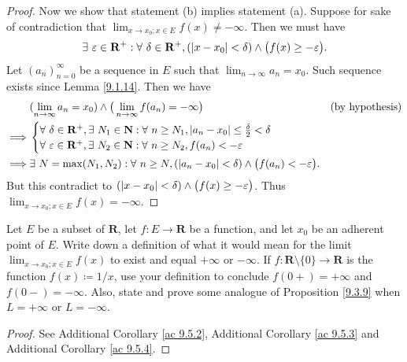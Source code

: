 \begin{proof}
    Now we show that statement (b) implies statement (a).
    Suppose for sake of contradiction that \(\lim_{x \to x_0 ; x \in E} f(x) \neq -\infty\).
    Then we must have
    \[
        \exists\ \varepsilon \in \mathbf{R}^+ : \forall\ \delta \in \mathbf{R}^+, (\abs*{x - x_0} < \delta) \land \big(f(x) \geq -\varepsilon\big).
    \]
    Let \((a_n)_{n = 0}^\infty\) be a sequence in \(E\) such that \(\lim_{n \to \infty} a_n = x_0\).
    Such sequence exists since Lemma \ref{9.1.14}.
    Then we have
    \begin{align*}
                 & (\lim_{n \to \infty} a_n = x_0) \land \big(\lim_{n \to \infty} f(a_n) = -\infty\big)                                & \text{(by hypothesis)} \\
        \implies & \begin{cases}
            \forall\ \delta \in \mathbf{R}^+, \exists\ N_1 \in \mathbf{N} : \forall\ n \geq N_1, \abs*{a_n - x_0} \leq \frac{\delta}{2} < \delta \\
            \forall\ \varepsilon \in \mathbf{R}^+, \exists\ N_2 \in \mathbf{N} : \forall\ n \geq N_2, f(a_n) < -\varepsilon
        \end{cases}                                                                                                                   \\
        \implies & \exists\ N = \max(N_1, N_2) : \forall\ n \geq N, (\abs*{a_n - x_0} < \delta) \land \big(f(a_n) < -\varepsilon\big).
    \end{align*}
    But this contradict to \((\abs*{x - x_0} < \delta) \land \big(f(x) \geq -\varepsilon\big)\).
    Thus \(\lim_{x \to x_0 ; x \in E} f(x) = -\infty\).
\end{proof}

\exercisesection

\begin{exercise}\label{ex 9.5.1}
    Let \(E\) be a subset of \(\mathbf{R}\), let \(f : E \to \mathbf{R}\) be a function, and let \(x_0\) be an adherent point of \(E\).
    Write down a definition of what it would mean for the limit \(\lim_{x \to x_0 ; x \in E} f(x)\) to exist and equal \(+\infty\) or \(-\infty\).
    If \(f : \mathbf{R} \setminus \{0\} \to \mathbf{R}\) is the function \(f(x) \coloneqq 1 / x\), use your definition to conclude \(f(0+) = +\infty\) and \(f(0-) = -\infty\).
    Also, state and prove some analogue of Proposition \ref{9.3.9} when \(L = +\infty\) or \(L = -\infty\).
\end{exercise}

\begin{proof}
    See Additional Corollary \ref{ac 9.5.2}, Additional Corollary \ref{ac 9.5.3} and Additional Corollary \ref{ac 9.5.4}.
\end{proof}